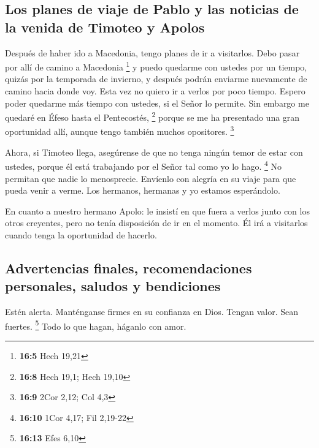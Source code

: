 \hypertarget{los-planes-de-viaje-de-pablo-y-las-noticias-de-la-venida-de-timoteo-y-apolos}{%
\subsection{Los planes de viaje de Pablo y las noticias de la venida de
Timoteo y
Apolos}\label{los-planes-de-viaje-de-pablo-y-las-noticias-de-la-venida-de-timoteo-y-apolos}}

 Después de haber ido a Macedonia, tengo planes de ir a
visitarlos. Debo pasar por allí de camino a Macedonia \footnote{\textbf{16:5}
  Hech 19,21}  y puedo quedarme con ustedes por un tiempo,
quizás por la temporada de invierno, y después podrán enviarme
nuevamente de camino hacia donde voy.  Esta vez no quiero
ir a verlos por poco tiempo. Espero poder quedarme más tiempo con
ustedes, si el Señor lo permite.  Sin embargo me quedaré
en Éfeso hasta el Pentecostés, \footnote{\textbf{16:8} Hech 19,1; Hech
  19,10}  porque se me ha presentado una gran oportunidad
allí, aunque tengo también muchos opositores. \footnote{\textbf{16:9}
  2Cor 2,12; Col 4,3}

 Ahora, si Timoteo llega, asegúrense de que no tenga
ningún temor de estar con ustedes, porque él está trabajando por el
Señor tal como yo lo hago. \footnote{\textbf{16:10} 1Cor 4,17; Fil
  2,19-22}  No permitan que nadie lo menosprecie.
Envíenlo con alegría en su viaje para que pueda venir a verme. Los
hermanos, hermanas y yo estamos esperándolo.

 En cuanto a nuestro hermano Apolo: le insistí en que
fuera a verlos junto con los otros creyentes, pero no tenía disposición
de ir en el momento. Él irá a visitarlos cuando tenga la oportunidad de
hacerlo.

\hypertarget{advertencias-finales-recomendaciones-personales-saludos-y-bendiciones}{%
\subsection{Advertencias finales, recomendaciones personales, saludos y
bendiciones}\label{advertencias-finales-recomendaciones-personales-saludos-y-bendiciones}}

 Estén alerta. Manténganse firmes en su confianza en
Dios. Tengan valor. Sean fuertes. \footnote{\textbf{16:13} Efes 6,10}
 Todo lo que hagan, háganlo con amor.

